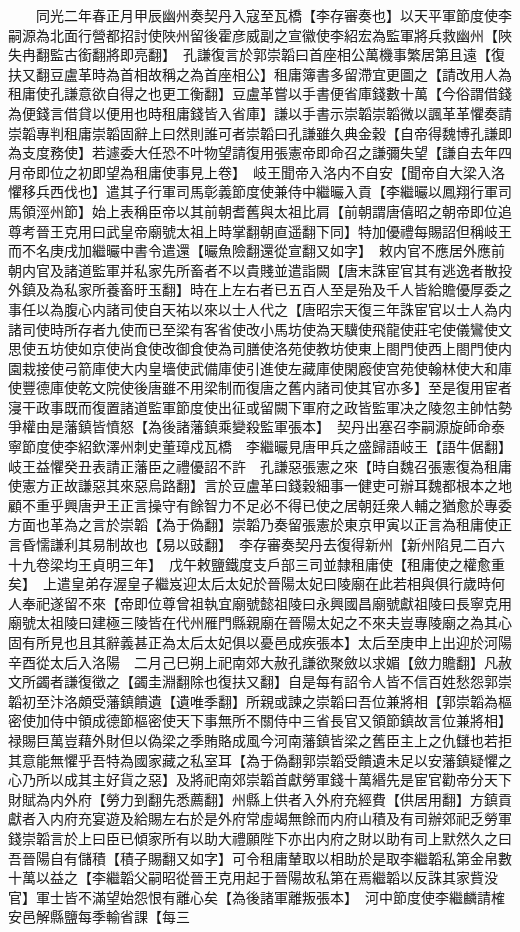 　　同光二年春正月甲辰幽州奏契丹入寇至瓦橋【李存審奏也】以天平軍節度使李嗣源為北面行營都招討使陜州留後霍彦威副之宣徽使李紹宏為監軍將兵救幽州【陜失冉翻監古銜翻將即亮翻】　孔謙復言於郭崇韜曰首座相公萬機事繁居第且遠【復扶又翻豆盧革時為首相故稱之為首座相公】租庸簿書多留滯宜更圖之【請改用人為租庸使孔謙意欲自得之也更工衡翻】豆盧革嘗以手書便省庫錢數十萬【今俗謂借錢為便錢言借貸以便用也時租庸錢皆入省庫】謙以手書示崇韜崇韜微以諷革革懼奏請崇韜專判租庸崇韜固辭上曰然則誰可者崇韜曰孔謙雖久典金穀【自帝得魏博孔謙即為支度務使】若遽委大任恐不叶物望請復用張憲帝即命召之謙彌失望【謙自去年四月帝即位之初即望為租庸使事見上卷】　岐王聞帝入洛内不自安【聞帝自大梁入洛懼移兵西伐也】遣其子行軍司馬彰義節度使兼侍中繼曮入貢【李繼曮以鳳翔行軍司馬領涇州節】始上表稱臣帝以其前朝耆舊與太祖比肩【前朝謂唐僖昭之朝帝即位追尊考晉王克用曰武皇帝廟號太祖上時掌翻朝直遥翻下同】特加優禮每賜詔但稱岐王而不名庚戌加繼曮中書令遣還【曮魚險翻還從宣翻又如字】　敕内官不應居外應前朝内官及諸道監軍并私家先所畜者不以貴賤並遣詣闕【唐末誅宦官其有逃逸者散投外鎮及為私家所養畜旴玉翻】時在上左右者已五百人至是殆及千人皆給贍優厚委之事任以為腹心内諸司使自天祐以來以士人代之【唐昭宗天復三年誅宦官以士人為内諸司使時所存者九使而已至梁有客省使改小馬坊使為天驥使飛龍使莊宅使儀鸞使文思使五坊使如京使尚食使改御食使為司膳使洛苑使教坊使東上閤門使西上閤門使内園栽接使弓箭庫使大内皇墻使武備庫使引進使左藏庫使閑廏使宫苑使翰林使大和庫使豐德庫使乾文院使後唐雖不用梁制而復唐之舊内諸司使其官亦多】至是復用宦者寖干政事既而復置諸道監軍節度使出征或留闕下軍府之政皆監軍决之陵忽主帥怙勢爭權由是藩鎮皆憤怒【為後諸藩鎮乘變殺監軍張本】　契丹出塞召李嗣源旋師命泰寧節度使李紹欽澤州刺史董璋戍瓦橋　李繼曮見唐甲兵之盛歸語岐王【語牛倨翻】岐王益懼癸丑表請正藩臣之禮優詔不許　孔謙惡張憲之來【時自魏召張憲復為租庸使憲方正故謙惡其來惡烏路翻】言於豆盧革曰錢穀細事一健吏可辦耳魏都根本之地顧不重乎興唐尹王正言操守有餘智力不足必不得已使之居朝廷衆人輔之猶愈於專委方面也革為之言於崇韜【為于偽翻】崇韜乃奏留張憲於東京甲寅以正言為租庸使正言昏懦謙利其易制故也【易以豉翻】　李存審奏契丹去復得新州【新州陷見二百六十九卷梁均王貞明三年】　戊午敕鹽鐵度支戶部三司並隸租庸使【租庸使之權愈重矣】　上遣皇弟存渥皇子繼岌迎太后太妃於晉陽太妃曰陵廟在此若相與俱行歲時何人奉祀遂留不來【帝即位尊曾祖執宜廟號懿祖陵曰永興國昌廟號獻祖陵曰長寧克用廟號太祖陵曰建極三陵皆在代州雁門縣親廟在晉陽太妃之不來夫豈專陵廟之為其心固有所見也且其辭義甚正為太后太妃俱以憂邑成疾張本】太后至庚申上出迎於河陽辛酉從太后入洛陽　二月己巳朔上祀南郊大赦孔謙欲聚斂以求媚【斂力贍翻】凡赦文所蠲者謙復徵之【蠲圭淵翻除也復扶又翻】自是每有詔令人皆不信百姓愁怨郭崇韜初至汴洛頗受藩鎮饋遺【遺唯季翻】所親或諫之崇韜曰吾位兼將相【郭崇韜為樞密使加侍中領成德節樞密使天下事無所不關侍中三省長官又領節鎮故言位兼將相】禄賜巨萬豈藉外財但以偽梁之季賄賂成風今河南藩鎮皆梁之舊臣主上之仇讎也若拒其意能無懼乎吾特為國家藏之私室耳【為于偽翻郭崇韜受饋遺未足以安藩鎮疑懼之心乃所以成其主好貨之惡】及將祀南郊崇韜首獻勞軍錢十萬緡先是宦官勸帝分天下財賦為内外府【勞力到翻先悉薦翻】州縣上供者入外府充經費【供居用翻】方鎮貢獻者入内府充宴遊及給賜左右於是外府常虛竭無餘而内府山積及有司辦郊祀乏勞軍錢崇韜言於上曰臣已傾家所有以助大禮願陛下亦出内府之財以助有司上默然久之曰吾晉陽自有儲積【積子賜翻又如字】可令租庸輦取以相助於是取李繼韜私第金帛數十萬以益之【李繼韜父嗣昭從晉王克用起于晉陽故私第在焉繼韜以反誅其家貲没官】軍士皆不滿望始怨恨有離心矣【為後諸軍離叛張本】　河中節度使李繼麟請榷安邑解縣鹽每季輸省課【每三